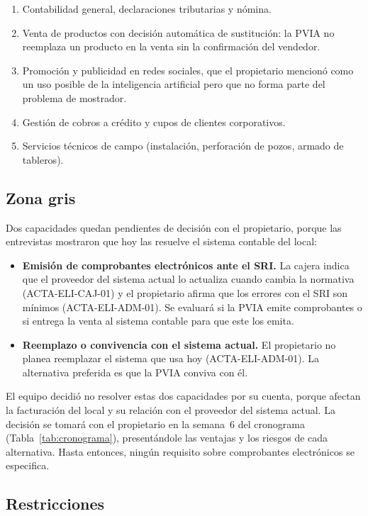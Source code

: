 \begin{enumerate}[label=FA-\arabic*, leftmargin=*]
\item Contabilidad general, declaraciones tributarias y nómina.
\item Venta de productos con decisión automática de sustitución: la PVIA no reemplaza un producto en la venta sin la confirmación del vendedor.
\item Promoción y publicidad en redes sociales, que el propietario mencionó como un uso posible de la inteligencia artificial pero que no forma parte del problema de mostrador.
\item Gestión de cobros a crédito y cupos de clientes corporativos.
\item Servicios técnicos de campo (instalación, perforación de pozos, armado de tableros).
\end{enumerate}

\subsection{Zona gris}

Dos capacidades quedan pendientes de decisión con el propietario, porque las entrevistas mostraron que hoy las resuelve el sistema contable del local:

\begin{itemize}
\item \textbf{Emisión de comprobantes electrónicos ante el SRI.} La cajera indica que el proveedor del sistema actual lo actualiza cuando cambia la normativa (ACTA-ELI-CAJ-01) y el propietario afirma que los errores con el SRI son mínimos (ACTA-ELI-ADM-01). Se evaluará si la PVIA emite comprobantes o si entrega la venta al sistema contable para que este los emita.
\item \textbf{Reemplazo o convivencia con el sistema actual.} El propietario no planea reemplazar el sistema que usa hoy (ACTA-ELI-ADM-01). La alternativa preferida es que la PVIA conviva con él.
\end{itemize}

El equipo decidió no resolver estas dos capacidades por su cuenta, porque afectan la facturación del local y su relación con el proveedor del sistema actual. La decisión se tomará con el propietario en la semana~6 del cronograma (Tabla~\ref{tab:cronograma}), presentándole las ventajas y los riesgos de cada alternativa. Hasta entonces, ningún requisito sobre comprobantes electrónicos se especifica.

\subsection{Restricciones}

